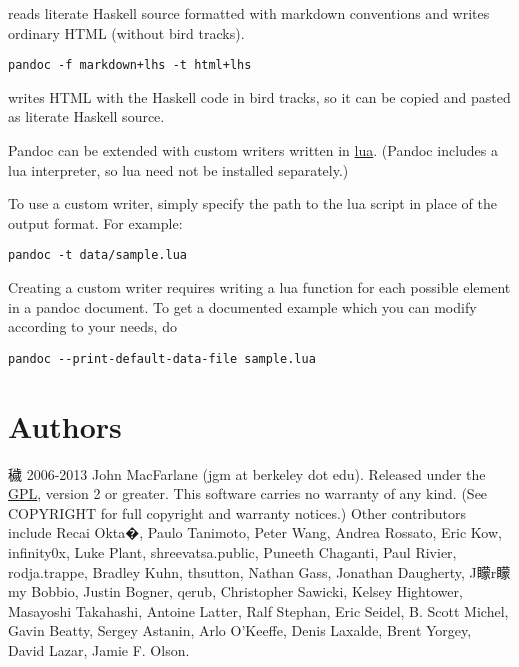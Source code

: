 \documentclass[]{article}
\begin{document}
reads literate Haskell source formatted with markdown conventions and
writes ordinary HTML (without bird tracks).

\begin{verbatim}
pandoc -f markdown+lhs -t html+lhs
\end{verbatim}

writes HTML with the Haskell code in bird tracks, so it can be copied
and pasted as literate Haskell source.


Pandoc can be extended with custom writers written in
\href{http://www.lua.org}{lua}. (Pandoc includes a lua interpreter, so
lua need not be installed separately.)

To use a custom writer, simply specify the path to the lua script in
place of the output format. For example:

\begin{verbatim}
pandoc -t data/sample.lua
\end{verbatim}

Creating a custom writer requires writing a lua function for each
possible element in a pandoc document. To get a documented example which
you can modify according to your needs, do

\begin{verbatim}
pandoc --print-default-data-file sample.lua
\end{verbatim}

\section{Authors}\label{authors}

穢 2006-2013 John MacFarlane (jgm at berkeley dot edu). Released under
the \href{http://www.gnu.org/copyleft/gpl.html}{GPL}, version 2 or
greater. This software carries no warranty of any kind. (See COPYRIGHT
for full copyright and warranty notices.) Other contributors include
Recai Okta�, Paulo Tanimoto, Peter Wang, Andrea Rossato, Eric Kow,
infinity0x, Luke Plant, shreevatsa.public, Puneeth Chaganti, Paul
Rivier, rodja.trappe, Bradley Kuhn, thsutton, Nathan Gass, Jonathan
Daugherty, J矇r矇my Bobbio, Justin Bogner, qerub, Christopher Sawicki,
Kelsey Hightower, Masayoshi Takahashi, Antoine Latter, Ralf Stephan,
Eric Seidel, B. Scott Michel, Gavin Beatty, Sergey Astanin, Arlo
O'Keeffe, Denis Laxalde, Brent Yorgey, David Lazar, Jamie F. Olson.
\end{document}
